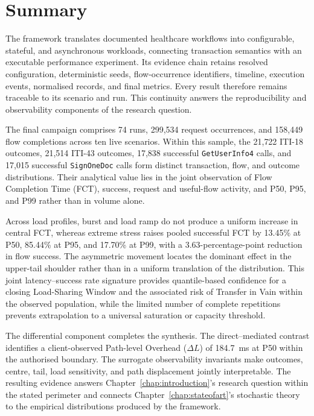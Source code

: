 \section{Summary}
\noindent The framework translates documented healthcare workflows into configurable,
stateful, and asynchronous workloads, connecting transaction semantics with an
executable performance experiment. Its evidence chain retains resolved
configuration, deterministic seeds, flow-occurrence identifiers, timeline,
execution events, normalised records, and final metrics. Every result therefore
remains traceable to its scenario and run. This continuity answers the
reproducibility and observability components of the research question.

\noindent The final campaign comprises 74 runs, 299{,}534 request occurrences, and
158{,}449 flow completions across ten live scenarios. Within this sample, the
21{,}722 ITI-18 outcomes, 21{,}514 ITI-43 outcomes, 17{,}838 successful
\texttt{GetUserInfo4} calls, and 17{,}015 successful \texttt{SignOneDoc} calls
form distinct transaction, flow, and outcome distributions. Their analytical
value lies in the joint observation of Flow Completion Time (FCT), success,
request and useful-flow activity, and P50, P95, and P99 rather than in volume
alone.

\noindent Across load profiles, burst and load ramp do not produce a uniform increase in
central FCT, whereas extreme stress raises pooled successful FCT by 13.45\% at
P50, 85.44\% at P95, and 17.70\% at P99, with a 3.63-percentage-point reduction
in flow success. The asymmetric movement locates the dominant effect in the
upper-tail shoulder rather than in a uniform translation of the distribution.
This joint latency--success rate signature provides quantile-based confidence for a closing Load-Sharing Window
and the associated risk of Transfer in Vain within the observed population,
while the limited number of complete repetitions prevents extrapolation to a
universal saturation or capacity threshold.

\noindent The differential component completes the synthesis. The direct--mediated
contrast identifies a client-observed Path-level Overhead ($\Delta L$)
of 184.7~ms at P50 within the authorised boundary. The surrogate observability invariants make outcomes, centre, tail, load sensitivity,
and path displacement jointly interpretable. The resulting evidence answers
Chapter~\ref{chap:introduction}'s research question within the stated perimeter
and connects Chapter~\ref{chap:stateofart}'s stochastic theory to the empirical
distributions produced by the framework.
\newpage
